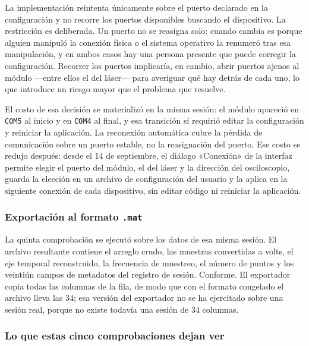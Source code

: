 La implementación reintenta únicamente sobre el puerto declarado en la
configuración y no recorre los puertos disponibles buscando el
dispositivo. La restricción es deliberada. Un puerto no se reasigna
solo: cuando cambia es porque alguien manipuló la conexión física o el
sistema operativo la renumeró tras esa manipulación, y en ambos casos
hay una persona presente que puede corregir la configuración. Recorrer
los puertos implicaría, en cambio, abrir puertos ajenos al módulo
---entre ellos el del láser--- para averiguar qué hay detrás de cada
uno, lo que introduce un riesgo mayor que el problema que resuelve.

El costo de esa decisión se materializó en la misma sesión: el módulo
apareció en \texttt{COM5} al inicio y en \texttt{COM4} al final, y esa
transición sí requirió editar la configuración y reiniciar la
aplicación. La reconexión automática cubre la pérdida de comunicación
sobre un puerto estable, no la reasignación del puerto. Ese costo se
redujo después: desde el 14 de septiembre, el diálogo «Conexión» de la
interfaz permite elegir el puerto del módulo, el del láser y la
dirección del osciloscopio, guarda la elección en un archivo de
configuración del usuario y la aplica en la siguiente conexión de cada
dispositivo, sin editar código ni reiniciar la aplicación.


\subsubsection*{Exportación al formato \texttt{.mat}}

La quinta comprobación se ejecutó sobre los datos de esa misma sesión.
El archivo resultante contiene el arreglo crudo, las muestras
convertidas a volts, el eje temporal reconstruido, la frecuencia de
muestreo, el número de puntos y los veintiún campos de metadatos del
registro de sesión. Conforme. El exportador copia todas las columnas
de la fila, de modo que con el formato congelado el archivo lleva las
34; esa versión del exportador no se ha ejercitado sobre una sesión
real, porque no existe todavía una sesión de 34 columnas.

\subsubsection*{Lo que estas cinco comprobaciones dejan ver}

